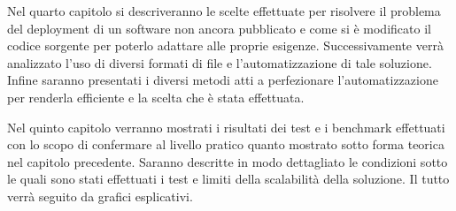 \documentclass[../main.tex]{subfiles}
\begin{document}
Nel quarto capitolo si descriveranno le scelte effettuate per risolvere il problema del deployment di un software non ancora pubblicato e come si è modificato il codice sorgente per poterlo adattare alle proprie esigenze. Successivamente verrà analizzato l'uso di diversi formati di file e l'automatizzazione di tale soluzione. Infine saranno presentati i diversi metodi atti a perfezionare l'automatizzazione per renderla efficiente e la scelta che è stata effettuata.

Nel quinto capitolo verranno mostrati i risultati dei test e i benchmark effettuati con lo scopo di confermare al livello pratico quanto mostrato sotto forma teorica nel capitolo precedente. Saranno descritte in modo dettagliato le condizioni sotto le quali sono stati effettuati i test e limiti della scalabilità della soluzione. Il tutto verrà seguito da grafici esplicativi.
\end{document}
